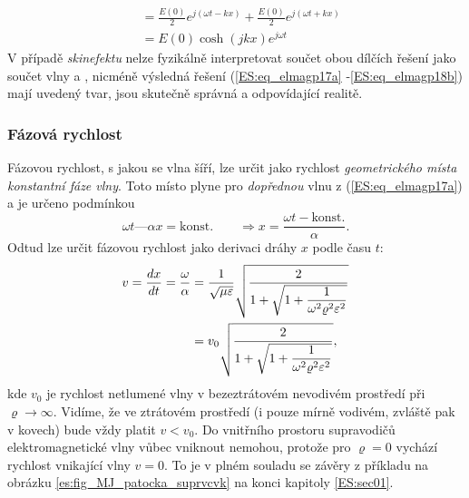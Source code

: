 {\begin{subequations}
\begin{align}
                           &= \frac{E(0)}{2}e^{j(\omega t - kx)} + 
                              \frac{E(0)}{2}e^{j(\omega t + kx)}                   \nonumber \\
                           &= E(0)\cosh(jkx)e^{j\omega t}         \label{ES:eq_elmagp18b}
          \end{align}
        \end{subequations}
        V případě \emph{skinefektu} nelze fyzikálně interpretovat součet obou dílčích řešení jako 
        součet vlny  a , nicméně výsledná řešení (\ref{ES:eq_elmagp17a} 
        -\ref{ES:eq_elmagp18b}) mají uvedený tvar, jsou skutečně správná a odpovídající realitě.

      \subsubsection{Fázová rychlost}
        Fázovou rychlost, s jakou se vlna šíří, lze určit jako rychlost \emph{geometrického místa 
        konstantní fáze vlny}. Toto místo plyne pro \emph{dopřednou} vlnu z (\ref{ES:eq_elmagp17a}) 
        a je určeno podmínkou
        \begin{equation}\label{ES:eq_elmagp19}
          \omega t—\alpha x = \text{konst.}\qquad\Rightarrow
                          x = \frac{\omega t - \text{konst.}}{\alpha}.
        \end{equation}
        Odtud lze určit fázovou rychlost jako derivaci dráhy \(x\) podle času \(t\):
        \begin{align}\label{ES:eq_elmagp20}
          v  = \dfrac{d x}{d t} = \frac{\omega}{\alpha}
            &= \frac{1}{\sqrt{\mu\varepsilon}}
               \sqrt{\dfrac{2}{1+\sqrt{1+\dfrac{1}{\omega^2\varrho^2\varepsilon^2}}}} \nonumber \\
            &= v_0\sqrt{\dfrac{2}{1+\sqrt{1+\dfrac{1}{\omega^2\varrho^2\varepsilon^2}}}},
        \end{align}
        kde \(v_0\) je rychlost netlumené vlny v bezeztrátovém nevodivém prostředí při \(\varrho 
        \rightarrow\infty\). Vidíme, že ve ztrátovém prostředí (i pouze mírně vodivém, zvláště 
        pak v kovech) bude vždy platit \(v < v_0\). Do vnitřního prostoru supravodičů 
        elektromagnetické vlny vůbec vniknout nemohou, protože pro \(\varrho = 0\) vychází rychlost 
        vnikající vlny \(v = 0\). To je v plném souladu se závěry z příkladu na obrázku 
        \ref{es:fig_MJ_patocka_suprvcvk} na konci kapitoly \ref{ES:sec01}.
        
}
